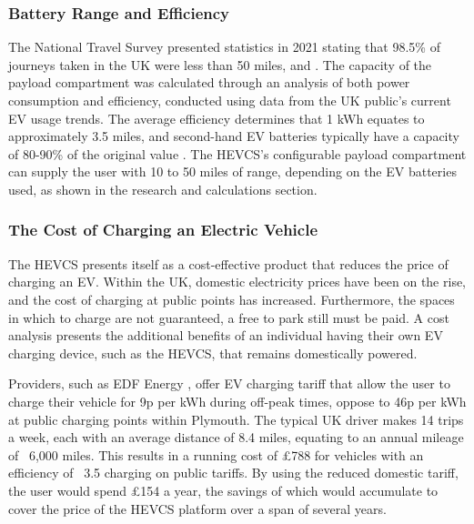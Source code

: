\documentclass [12pt]{article}
\begin{document}
\subsubsection{Battery Range and Efficiency}

The National Travel Survey presented statistics in 2021 stating that 98.5\% of journeys taken in the UK were less than 50 miles, and . The capacity of the payload compartment was calculated through an analysis of both power consumption and efficiency, conducted using data from the UK public’s current EV usage trends. The average efficiency determines that 1 kWh equates to approximately 3.5 miles, and second-hand EV batteries typically have a capacity of 80-90\% of the original value \cite{strickland2014estimation}. The HEVCS’s configurable payload compartment can supply the user with 10 to 50 miles of range, depending on the EV batteries used, as shown in the research and calculations section.

\subsubsection{The Cost of Charging an Electric Vehicle}
The HEVCS presents itself as a cost-effective product that reduces the price of charging an EV. Within the UK, domestic electricity prices have been on the rise, and the cost of charging at public points has increased. Furthermore, the spaces in which to charge are not guaranteed, a free to park still must be paid. A cost analysis presents the additional benefits of an individual having their own EV charging device, such as the HEVCS, that remains domestically powered.

Providers, such as EDF Energy \cite{edf}, offer EV charging tariff that allow the user to charge their vehicle for 9p per kWh during off-peak times, oppose to 46p per kWh at public charging points within Plymouth. The typical UK driver makes 14 trips a week, each with an average distance of 8.4 miles, equating to an annual mileage of ~6,000 miles. This results in a running cost of £788 for vehicles with an efficiency of ~3.5 charging on public tariffs. By using the reduced domestic tariff, the user would spend £154 a year, the savings of which would accumulate to cover the price of the HEVCS platform over a span of several years.
\end{document}
